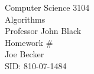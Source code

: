 \begin{titlepage}
\setlength{\topmargin}{1.5in}
\begin{center}
\Huge{Computer Science 3104} \\
\LARGE{Algorithms} \\
\Large{Professor John Black} \\[1cm]

\huge{Homework \#\HWnum}\\[0.5cm]

\large{Joe Becker} \\
\large{SID: 810-07-1484} \\
\large{\due} 

\end{center}

\end{titlepage}

